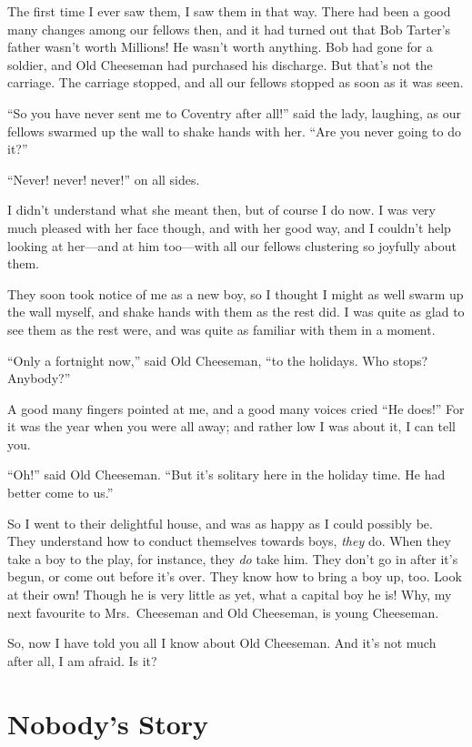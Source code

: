 The first time I ever saw them, I saw them in that way.  There had
been a good many changes among our fellows then, and it had turned
out that Bob Tarter's father wasn't worth Millions!  He wasn't worth
anything.  Bob had gone for a soldier, and Old Cheeseman had
purchased his discharge.  But that's not the carriage.  The carriage
stopped, and all our fellows stopped as soon as it was seen.

``So you have never sent me to Coventry after all!'' said the lady,
laughing, as our fellows swarmed up the wall to shake hands with
her.  ``Are you never going to do it?''

``Never! never! never!'' on all sides.

I didn't understand what she meant then, but of course I do now.  I
was very much pleased with her face though, and with her good way,
and I couldn't help looking at her---and at him too---with all our
fellows clustering so joyfully about them.

They soon took notice of me as a new boy, so I thought I might as
well swarm up the wall myself, and shake hands with them as the rest
did.  I was quite as glad to see them as the rest were, and was
quite as familiar with them in a moment.

``Only a fortnight now,'' said Old Cheeseman, ``to the holidays.  Who
stops?  Anybody?''

A good many fingers pointed at me, and a good many voices cried ``He
does!''  For it was the year when you were all away; and rather low I
was about it, I can tell you.

``Oh!'' said Old Cheeseman.  ``But it's solitary here in the holiday
time.  He had better come to us.''

So I went to their delightful house, and was as happy as I could
possibly be.  They understand how to conduct themselves towards
boys, \emph{they} do.  When they take a boy to the play, for instance, they
\emph{do} take him.  They don't go in after it's begun, or come out before
it's over.  They know how to bring a boy up, too.  Look at their
own!  Though he is very little as yet, what a capital boy he is!
Why, my next favourite to Mrs.\ Cheeseman and Old Cheeseman, is young
Cheeseman.

So, now I have told you all I know about Old Cheeseman.  And it's
not much after all, I am afraid.  Is it?



\chapter{Nobody's Story}



